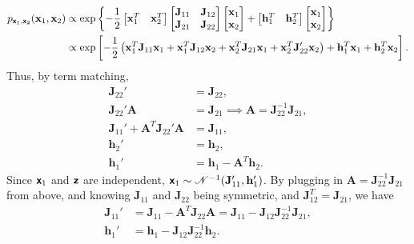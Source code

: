 \documentclass{article}
\newcommand{\bs}[1]{\textsf{\textbf{#1}}}
\newcommand{\bm}{\mathbf}
\begin{document}
\begin{align*}
p_{\bs{x}_1, \bs{x}_2}(\bm{x}_1, \bm{x}_2) &\propto \exp\left\{ -\frac{1}{2}
\begin{bmatrix}
    \bm{x}_1^T & \bm{x}_2^T 
\end{bmatrix}
\begin{bmatrix}
    \bm{J}_{11} & \bm{J}_{12} \\
    \bm{J}_{21} & \bm{J}_{22}
\end{bmatrix}
\begin{bmatrix}
    \bm{x}_1 \\
    \bm{x}_2
\end{bmatrix} + 
\begin{bmatrix}
    \bm{h}_1^T & \bm{h}_2^T
\end{bmatrix}
\begin{bmatrix}
    \bm{x}_1 \\
    \bm{x}_2
\end{bmatrix}
\right\}\\
&\propto\exp\left[
-\frac{1}{2}\left(
\bm{x}_1^T\bm{J}_{11}\bm{x}_1 +
\bm{x}_1^T\bm{J}_{12}\bm{x}_2 +
\bm{x}_2^T\bm{J}_{21}\bm{x}_1 +
\bm{x}_2^ T\bm{J}_{22}'\bm{x}_2
\right) + 
\bm{h}_1^T \bm{x}_1 +
\bm{h}_2^T \bm{x}_2
\right].
\end{align*}
%
Thus, by term matching,
%
\begin{align*}
	\bm{J}_{22}' &= \bm{J}_{22}, \\
	\bm{J}_{22}'\bm{A} &= \bm{J}_{21} \implies \bm{A} = \bm{J}_{22}^{-1}\bm{J}_{21}, \\
	\bm{J}_{11}' + \bm{A}^T\bm{J}_{22}'\bm{A} &= \bm{J}_{11},\\ %
	\bm{h}_2' &= \bm{h}_2,\\
	\bm{h}_1' &= \bm{h}_1 - \bm{A}^T\bm{h}_2.
\end{align*}
Since $\bs{x}_1$ and $\bs{z}$ are independent, $\bs{x}_1 \sim \mathscr{N}^{-1}(\bm{J}_{11}', \bm{h}_{1}')$.
By plugging in $\bm{A} = \bm{J}_{22}^{-1}\bm{J}_{21}$ from above, and knowing
$\bm{J}_{11}$ and $\bm{J}_{22}$ being symmetric, and $\bm{J}_{12}^T =\bm{J}_{21}$, we have
\begin{align*}
	\bm{J}_{11}' &= \bm{J}_{11} - \bm{A}^T\bm{J}_{22}\bm{A} = \bm{J}_{11} - \bm{J}_{12}\bm{J}_{22}^{-1}\bm{J}_{21},\\
	\bm{h}_1' &= \bm{h}_1 - \bm{J}_{12}\bm{J}_{22}^{-1}\bm{h}_2.
\end{align*}
\end{document}
